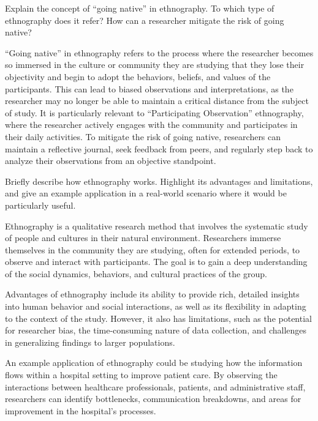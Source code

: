 \begin{ejercicio}
    Explain the concept of ``going native'' in ethnography. To which type of ethnography does it refer? How can a researcher mitigate the risk of going native?

    ``Going native'' in ethnography refers to the process where the researcher becomes so immersed in the culture or community they are studying that they lose their objectivity and begin to adopt the behaviors, beliefs, and values of the participants. This can lead to biased observations and interpretations, as the researcher may no longer be able to maintain a critical distance from the subject of study. It is particularly relevant to ``Participating Observation'' ethnography, where the researcher actively engages with the community and participates in their daily activities. To mitigate the risk of going native, researchers can maintain a reflective journal, seek feedback from peers, and regularly step back to analyze their observations from an objective standpoint.
\end{ejercicio}

\begin{ejercicio}
    Briefly describe how ethnography works. Highlight its advantages and limitations, and give an example application in a real-world scenario where it would be particularly useful.

    Ethnography is a qualitative research method that involves the systematic study of people and cultures in their natural environment. Researchers immerse themselves in the community they are studying, often for extended periods, to observe and interact with participants. The goal is to gain a deep understanding of the social dynamics, behaviors, and cultural practices of the group.

    Advantages of ethnography include its ability to provide rich, detailed insights into human behavior and social interactions, as well as its flexibility in adapting to the context of the study. However, it also has limitations, such as the potential for researcher bias, the time-consuming nature of data collection, and challenges in generalizing findings to larger populations.

    An example application of ethnography could be studying how the information flows within a hospital setting to improve patient care. By observing the interactions between healthcare professionals, patients, and administrative staff, researchers can identify bottlenecks, communication breakdowns, and areas for improvement in the hospital's processes.
\end{ejercicio}

